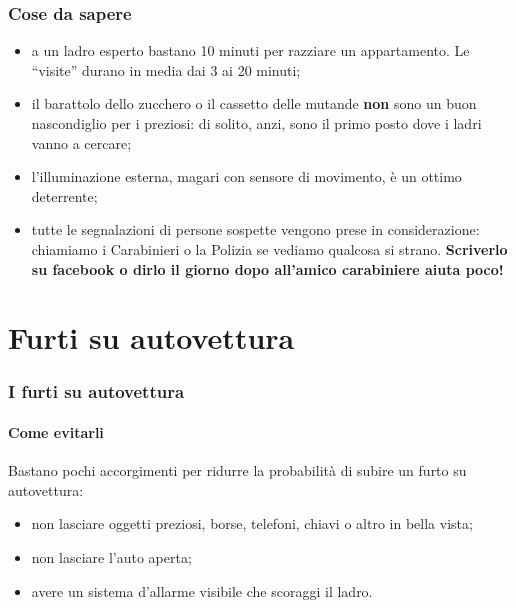 \documentclass[11pt]{beamer}
\begin{document}
	\begin{frame}
		\frametitle{Cose da sapere}
		\begin{itemize}
			\item a un ladro esperto bastano 10 minuti per razziare un appartamento. Le ``visite'' durano in media dai 3 ai 20  minuti;
			\item il barattolo dello zucchero o il cassetto delle mutande \textbf{non} sono un buon nascondiglio per i preziosi: di solito, anzi, sono il primo posto dove i ladri vanno a cercare;
			\item l'illuminazione esterna, magari con sensore di movimento, è un ottimo deterrente;
			\item tutte le segnalazioni di persone sospette vengono prese in considerazione: chiamiamo i Carabinieri o la Polizia se vediamo qualcosa si strano. \textbf{Scriverlo su facebook o dirlo il giorno dopo all'amico carabiniere aiuta poco!}
		\end{itemize}
	\end{frame}

	\section{Furti su autovettura}
	\begin{frame}
		\frametitle{I furti su autovettura}
		\framesubtitle{Come evitarli}
		Bastano pochi accorgimenti per ridurre la probabilità di subire un furto su autovettura:
		\begin{itemize}
			\item non lasciare oggetti preziosi, borse, telefoni, chiavi o altro in bella vista;
			\item non lasciare l'auto aperta;
			\item avere un sistema d'allarme visibile che scoraggi il ladro.
			
		\end{itemize}
	\end{frame}
\end{document}
